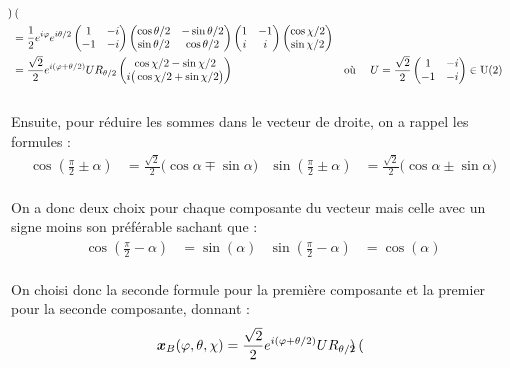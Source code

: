 \begin{annexe}
\begin{align*}
\begin{pmatrix}
		\end{pmatrix} \\
		&= \frac{1}{2}e^{i\varphi} e^{i\theta/2}\begin{pmatrix} 
			1 & -i \\
			-1 & -i
		\end{pmatrix}\begin{pmatrix} 
			\cos \theta/2 & -\sin \theta/2 \\ 
			\sin \theta/2 & \cos \theta/2 
		\end{pmatrix} \begin{pmatrix} 
			1 & -1 \\ i & i
		\end{pmatrix}\begin{pmatrix} 
			\cos \chi/2 \\ 
			\sin\chi/2
		\end{pmatrix} \\
		&= \frac{\sqrt{2}}{2}e^{i(\varphi + \theta/2)}U R_{\theta/2} \begin{pmatrix} 
			\cos \chi/2 - \sin\chi/2 \\ 
			i\big(\cos\chi/2 + \sin\chi/2\big)
		\end{pmatrix}   & &\text{où }\quad U = \frac{\sqrt{2}}{2}\begin{pmatrix} 
		1 & -i \\ -1 & -i
		\end{pmatrix}\in \text{\normalfont U}(2) \\
\end{align*}
\\
Ensuite, pour réduire les sommes dans le vecteur de droite, on a rappel les formules :
\begin{align*}
	\cos\left( \frac{\pi}{2} \pm \alpha\right) &= \frac{\sqrt{2}}{2}\big( \cos\alpha \mp \sin \alpha \big) & \sin\left( \frac{\pi}{2} \pm \alpha\right) &= \frac{\sqrt{2}}{2}\big( \cos\alpha \pm \sin \alpha \big)
\end{align*}
\\ 
On a donc deux choix pour chaque composante du vecteur mais celle avec un signe moins son préférable sachant que : 
\begin{align*}
	\cos\left( \frac{\pi}{2} - \alpha\right) &= \sin(\alpha) &  \sin\left( \frac{\pi}{2} - \alpha\right) &= \cos(\alpha)
\end{align*}
\\
On choisi donc la seconde formule pour la première composante et la premier pour la seconde composante, donnant :
\begin{align*}
	\boldsymbol{x}_B(\varphi, \theta, \chi) &= \frac{\sqrt{2}}{2}e^{i(\varphi + \theta/2)}U R_{\theta/2} \begin{pmatrix} 

\end{pmatrix}
\end{align*}
\end{annexe}
